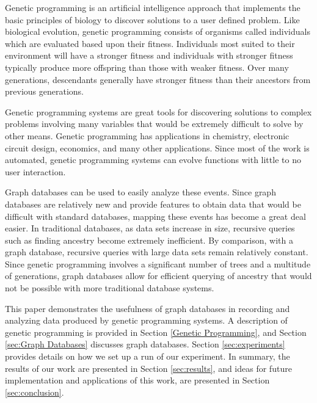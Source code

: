 \documentclass[12pt]{article}
\begin{document}
Genetic programming is an artificial intelligence approach that implements the basic principles of biology to discover solutions to a user defined problem. Like biological evolution, genetic programming consists of organisms called individuals which are evaluated based upon their fitness. Individuals most suited to their environment will have a stronger fitness and individuals with stronger fitness typically produce more offspring than those with weaker fitness. Over many generations, descendants generally have stronger fitness than their ancestors from previous generations. 

Genetic programming systems are great tools for discovering solutions to complex problems involving many variables that would be extremely difficult to solve by other means. Genetic programming has applications in chemistry, electronic circuit design, economics, and many other applications. Since most of the work is automated, genetic programming systems can evolve functions with little to no user interaction.

Graph databases can be used to easily analyze these events.  Since graph databases are relatively new and provide features to obtain data that would be difficult with standard databases, mapping these events has become a great deal easier. In traditional databases, as data sets increase in size, recursive queries such as finding ancestry become extremely inefficient. By comparison, with a graph database, recursive queries with large data sets remain relatively constant. Since genetic programming involves a significant number of trees and a multitude of generations, graph databases allow for efficient querying of ancestry that would not be possible with more traditional database systems.

This paper demonstrates the usefulness of graph databases in recording and analyzing data produced by genetic programming systems. A description of genetic programming is provided in Section \ref{Genetic Programming}, and Section \ref{sec:Graph Databases} discusses graph databases. Section \ref{sec:experiments} provides details on how we set up a run of our experiment. In summary, the results of our work are presented in Section \ref{sec:results}, and ideas for future implementation and applications of this work, are presented in Section \ref{sec:conclusion}.
\end{document}
